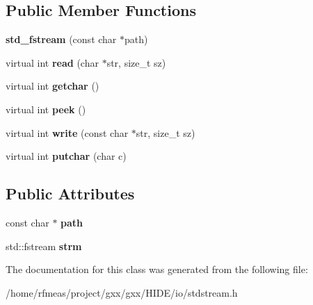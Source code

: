 \subsection*{Public Member Functions}
\begin{DoxyCompactItemize}
\item 
{\bfseries std\+\_\+fstream} (const char $\ast$path)\hypertarget{classgxx_1_1std__fstream_a0bec88efcd4286a42d336a64c1011070}{}\label{classgxx_1_1std__fstream_a0bec88efcd4286a42d336a64c1011070}

\item 
virtual int {\bfseries read} (char $\ast$str, size\+\_\+t sz)\hypertarget{classgxx_1_1std__fstream_a888345fafad188edc54d793a3f63a0f9}{}\label{classgxx_1_1std__fstream_a888345fafad188edc54d793a3f63a0f9}

\item 
virtual int {\bfseries getchar} ()\hypertarget{classgxx_1_1std__fstream_a0d159ca73a928f4a77eaab8c21e7d871}{}\label{classgxx_1_1std__fstream_a0d159ca73a928f4a77eaab8c21e7d871}

\item 
virtual int {\bfseries peek} ()\hypertarget{classgxx_1_1std__fstream_a3487b1cf7d3612424b83514fe41102be}{}\label{classgxx_1_1std__fstream_a3487b1cf7d3612424b83514fe41102be}

\item 
virtual int {\bfseries write} (const char $\ast$str, size\+\_\+t sz)\hypertarget{classgxx_1_1std__fstream_a0bc7665bace5f5bf7ba056969637aec7}{}\label{classgxx_1_1std__fstream_a0bc7665bace5f5bf7ba056969637aec7}

\item 
virtual int {\bfseries putchar} (char c)\hypertarget{classgxx_1_1std__fstream_a280ac3d7330d55b4f7cbb837d2260a2f}{}\label{classgxx_1_1std__fstream_a280ac3d7330d55b4f7cbb837d2260a2f}

\end{DoxyCompactItemize}
\subsection*{Public Attributes}
\begin{DoxyCompactItemize}
\item 
const char $\ast$ {\bfseries path}\hypertarget{classgxx_1_1std__fstream_a62deeb3e1e0878fe37645b6724579ffa}{}\label{classgxx_1_1std__fstream_a62deeb3e1e0878fe37645b6724579ffa}

\item 
std\+::fstream {\bfseries strm}\hypertarget{classgxx_1_1std__fstream_a141fb29365b019f5480a212330732418}{}\label{classgxx_1_1std__fstream_a141fb29365b019f5480a212330732418}

\end{DoxyCompactItemize}


The documentation for this class was generated from the following file\+:\begin{DoxyCompactItemize}
\item 
/home/rfmeas/project/gxx/gxx/\+H\+I\+D\+E/io/stdstream.\+h\end{DoxyCompactItemize}
